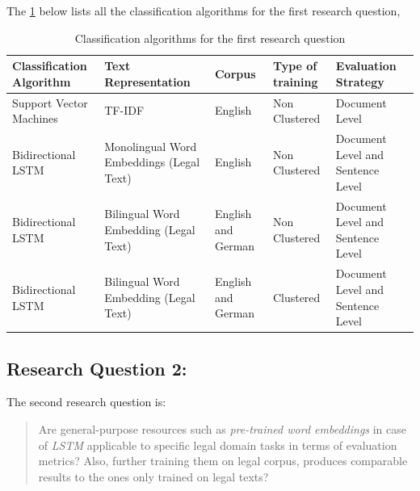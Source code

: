 The \ref{table:ListQuestionFirstQuestion} below lists all the classification algorithms for the first research question,

\clearpage

\begin{table}[!ht]
\centering
\begin{tabular}{>{\centering\arraybackslash}m{3cm}>{\centering\arraybackslash}m{3cm}>{\centering\arraybackslash}m{1.5cm}>{\centering\arraybackslash}m{2.3cm}>{\centering\arraybackslash}m{3cm}}
\hline
\textbf{Classification Algorithm} & \textbf{Text Representation} & \textbf{Corpus} & \textbf{Type of training} & \textbf{Evaluation Strategy} \\ [0.2cm]\hline
Support Vector Machines & TF-IDF & English & Non Clustered & Document Level \\[0.3cm]
Bidirectional LSTM & Monolingual Word Embeddings (Legal Text) & English & Non Clustered & Document Level and Sentence Level \\[0.3cm]
Bidirectional LSTM & Bilingual Word Embedding (Legal Text) & English and German & Non Clustered & Document Level and Sentence Level \\[0.3cm]
Bidirectional LSTM & Bilingual Word Embedding (Legal Text) & English and German & Clustered & Document Level and Sentence Level \\ \hline
\end{tabular}
\caption{Classification algorithms for the first research question}
\label{table:ListQuestionFirstQuestion}
\end{table}



\subsection{Research Question 2:} \label{question2}
The second research question is:

\begin{quote}
    Are general-purpose resources such as \textit{pre-trained word embeddings} in case of \textit{LSTM} applicable to specific legal domain tasks in terms of evaluation metrics? Also, further training them on legal corpus, produces comparable results to the ones only trained on legal texts?
\end{quote}

